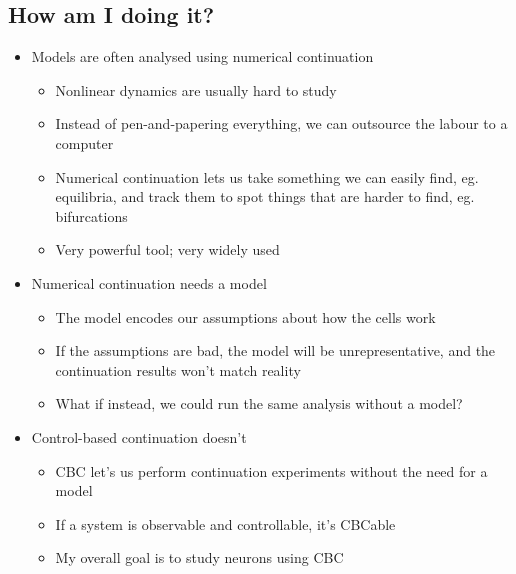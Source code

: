 \documentclass[11pt]{article}
\begin{document}
\subsection{How am I doing it?}
\label{sec:org1be5909}
\begin{itemize}
\item Models are often analysed using numerical continuation
\begin{itemize}
\item Nonlinear dynamics are usually hard to study
\item Instead of pen-and-papering everything, we can outsource the labour to a computer
\item Numerical continuation lets us take something we can easily find, eg. equilibria, and track them to spot things that are harder to find, eg. bifurcations
\item Very powerful tool; very widely used
\end{itemize}

\item Numerical continuation needs a model
\begin{itemize}
\item The model encodes our assumptions about how the cells work
\item If the assumptions are bad, the model will be unrepresentative, and the continuation results won't match reality
\item What if instead, we could run the same analysis without a model?
\end{itemize}

\item Control-based continuation doesn't
\begin{itemize}
\item CBC let's us perform continuation experiments without the need for a model
\item If a system is observable and controllable, it's CBCable
\item My overall goal is to study neurons using CBC
\end{itemize}
\end{itemize}
\end{document}
